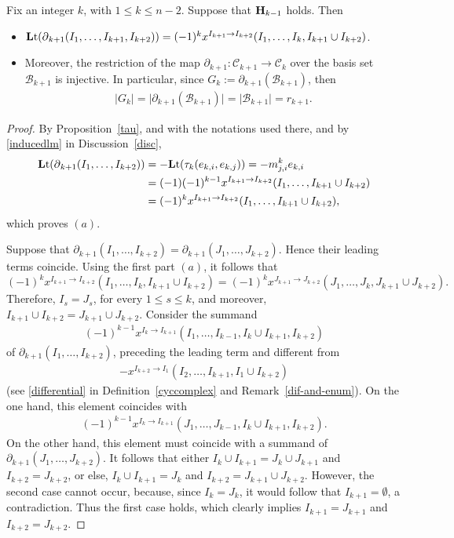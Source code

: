 \documentclass[ALCO]{cedram}
\newcommand{\lt}{\mbox{${\bf L}{\rm t}$}}
\newcommand{\mcb}{\mbox{$\mathcal{B}$}}
\newcommand{\mcc}{\mbox{$\mathcal{C}$}}
\newcommand{\mbfh}{\mbox{${\bf H}$}}
\newcommand{\dif}{\mbox{$\partial$}}
\begin{document}
\begin{corollary}\label{ltbij}
Fix an integer $k$, with $1\leq k\leq n-2$. Suppose that $\mbfh_{k-1}$
holds. Then 
\begin{itemize}
\item[$(a)$]
  $\lt(\dif_{k+1}(I_1,\ldots,I_{k+1},I_{k+2}))=(-1)^{k}x^{I_{k+1}\to
  I_{k+2}}(I_1,\ldots, I_{k},I_{k+1}\cup I_{k+2})$.
\item[$(b)$] Moreover, the restriction of the map
  $\dif_{k+1}:\mcc_{k+1}\to\mcc_{k}$ over the basis set $\mcb_{k+1}$
  is injective. In particular, since $G_k:=\dif_{k+1}(\mcb_{k+1})$,
  then 
\begin{eqnarray*}
\lvert
G_k\rvert=\lvert\dif_{k+1}(\mcb_{k+1})\rvert=
\lvert\mcb_{k+1}\rvert=r_{k+1}.
\end{eqnarray*}
\end{itemize}
\end{corollary}
\begin{proof}
By Proposition~\ref{tau}, and with the notations used there, and by
\eqref{inducedlm} in Discussion~\ref{disc},
\begin{align*}
\lt(\dif_{k+1}(I_1,\ldots,I_{k+2}))&=-\lt(\tau_{k}(e_{k,i},e_{k,j}))
=-m^{k}_{j,i}e_{k,i}
\\ &= (-1)(-1)^{k-1}x^{I_{k+1}\to I_{k+2}}(I_1,\ldots,
I_{k+1}\cup I_{k+2})\\
&= (-1)^{k}x^{I_{k+1}\to I_{k+2}}(I_1,\ldots,
I_{k+1}\cup I_{k+2}),
\end{align*}
which proves $(a)$.

Suppose that $\dif_{k+1}(I_1,\ldots ,I_{k+2})=\dif_{k+1}(J_1,\ldots
,J_{k+2})$. Hence their leading terms coincide. Using the first part
$(a)$, it follows that
\[
 (-1)^{k}x^{I_{k+1}\to I_{k+2}}(I_1,\ldots,I_{k},I_{k+1}\cup
  I_{k+2})\!=\! (-1)^{k}x^{J_{k+1}\to
    J_{k+2}}(J_1,\ldots,J_{k},J_{k+1}\cup J_{k+2}).
\]
Therefore, $I_s=J_s$, for every $1\leq s\leq k$, and moreover,
$I_{k+1}\cup I_{k+2}=J_{k+1}\cup J_{k+2}$. Consider the summand
\begin{eqnarray*}
(-1)^{k-1}x^{I_{k}\to I_{k+1}}(I_1,\ldots ,I_{k-1},I_{k}\cup
  I_{k+1},I_{k+2})
\end{eqnarray*} 
of $\dif_{k+1}(I_1,\ldots ,I_{k+2})$, preceding the leading term and
different from 
\begin{eqnarray*}
-x^{I_{k+2}\to I_1}(I_2,\ldots ,I_{k+1},I_1\cup I_{k+2})
\end{eqnarray*}
(see \eqref{differential} in Definition~\ref{cyccomplex} and
Remark~\ref{dif-and-enum}). On the one hand, this element coincides
with
\begin{eqnarray*}
(-1)^{k-1}x^{I_{k}\to I_{k+1}}(J_1,\ldots ,J_{k-1},I_{k}\cup
  I_{k+1},I_{k+2}). 
\end{eqnarray*}
On the other hand, this element must coincide with a summand of
$\dif_{k+1}(J_1,\ldots ,J_{k+2})$. It follows that either $I_{k}\cup
I_{k+1}=J_{k}\cup J_{k+1}$ and $I_{k+2}=J_{k+2}$, or else, $I_{k}\cup
I_{k+1}=J_{k}$ and $I_{k+2}=J_{k+1}\cup J_{k+2}$. However, the second
case cannot occur, because, since $I_{k}=J_{k}$, it would follow that
$I_{k+1}=\emptyset$, a contradiction. Thus the first case holds, which
clearly implies $I_{k+1}=J_{k+1}$ and $I_{k+2}=J_{k+2}$.
\end{proof}
\end{document}
